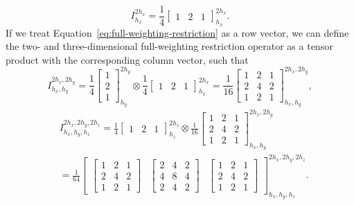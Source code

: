 \begin{equation}
	I_{h_x}^{2h_x} =  \frac{1}{4} \begin{bmatrix}
			1 & 2 & 1
		\end{bmatrix}_{h_x}^{2h_x}.
	\label{eq:full-weighting-restriction}
\end{equation} 
If we treat Equation~\eqref{eq:full-weighting-restriction} as a row vector, we can define the two- and three-dimensional full-weighting restriction operator as a tensor product with the corresponding column vector, such that
\begin{equation}
	I^{2h_x, 2h_y}_{h_x, h_y} = \frac{1}{4} \begin{bmatrix}
		1 \\ 2 \\ 1
	\end{bmatrix}_{h_y}^{2h_y} \otimes \frac{1}{4} \begin{bmatrix}
		1 & 2 & 1
	\end{bmatrix}_{h_x}^{2h_x} =
\frac{1}{16} 
\begin{bmatrix}
	1 & 2 & 1 \\
	2 & 4 & 2 \\
	1 & 2 & 1
\end{bmatrix}^{2h_x, 2h_y}_{h_x, h_y},
\end{equation} 
\begin{equation}
\begin{split}
	& I^{2h_x, 2h_y, 2h_z}_{h_x, h_y, h_z} = \frac{1}{4} \begin{bmatrix}
		1 & 2 & 1
	\end{bmatrix}_{h_z}^{2h_z} \otimes 
	\frac{1}{16} 
	\begin{bmatrix}
		1 & 2 & 1 \\
		2 & 4 & 2 \\
		1 & 2 & 1
	\end{bmatrix}^{2h_x, 2h_y}_{h_x, h_y} \\
& = \frac{1}{64} \begin{bmatrix}
\begin{bmatrix}
	1 & 2 & 1 \\
	2 & 4 & 2 \\
	1 & 2 & 1
\end{bmatrix} &	\begin{bmatrix}
2 & 4 & 2 \\
4 & 8 & 4 \\
2 & 4 & 2
\end{bmatrix} &
\begin{bmatrix}
	1 & 2 & 1 \\
	2 & 4 & 2 \\
	1 & 2 & 1
\end{bmatrix}
\end{bmatrix}^{2h_x, 2h_y, 2h_z}_{h_x, h_y, h_z}.
\end{split}
\end{equation}
